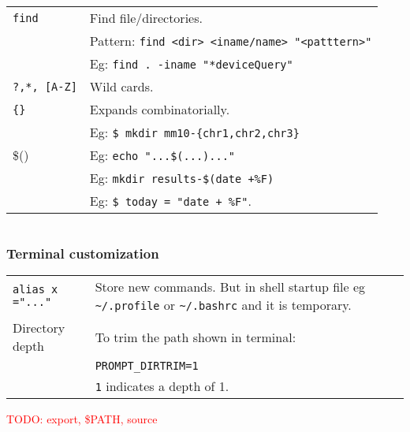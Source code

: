 \begin{tabularx}{\linewidth}{lX}
    \texttt{find}           & Find file/directories.\\
                            & Pattern: \texttt{find <dir> <iname/name> "<patttern>"}\\
                            & Eg: \texttt{find . -iname "*deviceQuery"}\\
    \hline
    
    \texttt{?,*, [A-Z]} & Wild cards.\\
    \texttt{\{\}} & Expands combinatorially.\\ 
    &  Eg: \texttt{\$ mkdir mm10-\{chr1,chr2,chr3\}}\\
    \$() & Eg: \texttt{echo "...\$(...)..."}\\
    & Eg: \texttt{mkdir results-\$(date +\%F)}\\
    & Eg: \texttt{\$ today = "date + \%F"}. \\
    \hline

\end{tabularx}

\vfill\null
\columnbreak 

\begin{tabularx}{\linewidth}{lX}

\end{tabularx}


\subsubsection{Terminal customization}

\begin{tabularx}{\linewidth}{lX}
    \texttt{alias x ="..."}             & Store new commands. But in shell startup file eg \texttt{\~{}/.profile} or \texttt{\~{}/.bashrc} and it is temporary.\\
    Directory depth                     & To trim the path shown in terminal:\\
                                        & \texttt{PROMPT\_DIRTRIM=1}\\
                                        & \texttt{1} indicates a depth of 1.\\
\end{tabularx}

\textcolor{red}{TODO: export, \$PATH, source}


\vfill\null
\columnbreak